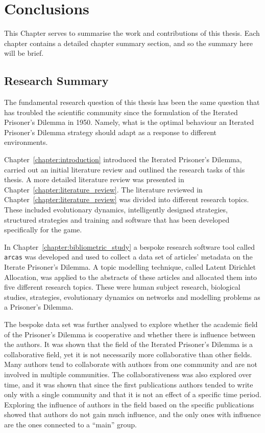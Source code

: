 \chapter{Conclusions}\label{chapter:conclusion}

This Chapter serves to summarise the work and contributions of this thesis. Each
chapter contains a detailed chapter summary section, and so the summary here will be
brief.

\section{Research Summary}

The fundamental research question of this thesis has been the same question that
has troubled the scientific community since the formulation of the Iterated
Prisoner's Dilemma in 1950. Namely, what is the optimal behaviour an Iterated
Prisoner's Dilemma strategy should adapt as a response to different
environments.

Chapter~\ref{chapter:introduction} introduced the Iterated Prisoner's Dilemma,
carried out an initial literature review and outlined the research tasks of this
thesis. A more detailed literature review was presented in
Chapter~\ref{chapter:literature_review}. The literature reviewed in
Chapter~\ref{chapter:literature_review} was divided into different research
topics. These included evolutionary dynamics, intelligently designed strategies,
structured strategies and training and software that has been developed
specifically for the game.

In Chapter~\ref{chapter:bibliometric_study} a bespoke research software tool
called \texttt{arcas} was developed and used to collect a data set
of articles' metadata on the Iterate Prisoner's Dilemma. A topic modelling
technique, called Latent Dirichlet Allocation, was applied to the abstracts of these
articles and allocated them into five different research topics. These were human
subject research, biological studies, strategies, evolutionary dynamics on
networks and modelling problems as a Prisoner's Dilemma.

The bespoke data set was further analysed to explore whether the academic field
of the Prisoner's Dilemma is cooperative and whether there is influence between
the authors. It was shown that the field of the Iterated Prisoner's Dilemma is a
collaborative field, yet it is not necessarily more collaborative than other
fields. Many authors tend to collaborate with authors from one community
and are not involved in multiple communities. The collaborativeness was also
explored over time, and it was shown that since the first publications authors
tended to write only with a single community and that it is not an effect of a
specific time period. Exploring the influence of authors
in the field based on the specific publications showed that authors do not gain
much influence, and the only ones with influence are the ones connected to a
``main'' group.

